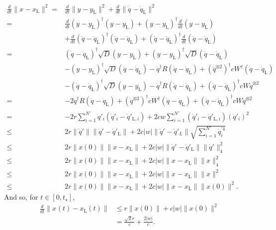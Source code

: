 \documentclass[superscriptaddress,onecolumn,nofootinbib,longbibliography,a4paper,accepted=2026-09-29]{quantumarticle}
\theoremstyle{plain}
\theoremstyle{definition}
\numberwithin{thm}{section}
\numberwithin{assumption}{section}
\numberwithin{lemma}{section}
\numberwithin{prop}{section}
\numberwithin{cor}{section}
\numberwithin{definition}{section}
\numberwithin{rmk}{section}
\numberwithin{equation}{section}
\begin{document}
\begin{align*}
  \frac{d}{dt} \| x_{} - x_{\mathrm{L}} \|^2 =&\frac{d}{dt} \| y_{} - y_{\mathrm{L}} \|^2 + \frac{d}{dt} \| \dot{q}_{} - \dot{q}_{\mathrm{L}} \|^2  \\
     =& \frac{d}{dt}( y_{} - y_{\mathrm{L}})^\dag (y_{} - y_{\mathrm{L}}) +  ( y_{} - y_{\mathrm{L}})^\dag\frac{d}{dt}(y_{} - y_{\mathrm{L}}) \\
   & + \frac{d}{dt}( \dot{q}_{} - \dot{q}_{\mathrm{L}})^\dag (\dot{q}_{} - \dot{q}_{\mathrm{L}}) +  ( \dot{q}_{} - \dot{q}_{\mathrm{L}})^\dag\frac{d}{dt}(\dot{q}_{} - \dot{q}_{\mathrm{L}})
   \\
     =& (\dot{q}_{} - \dot{q}_{\mathrm{L}})^\dag \sqrt{D}(y_{} - y_{\mathrm{L}}) +  ( y_{} - y_{\mathrm{L}})^\dag \sqrt{D}(\dot{q}_{} - \dot{q}_{\mathrm{L}}) \\
   &  - (y_{} - y_{\mathrm{L}})^\dag \sqrt{D} (\dot{q}_{} - \dot{q}_{\mathrm{L}}) -   \dot{q}_{} ^\dag R (\dot{q}_{} - \dot{q}_{\mathrm{L}}) + (\dot{q}^{\otimes 2})^\dag_{} c W^\dag (\dot{q}_{} - \dot{q}_{\mathrm{L}})   \\ &  - (\dot{q}_{} - \dot{q}_{\mathrm{L}})^\dag \sqrt{D} (y_{} - y_{\mathrm{L}})  -   \dot{q}_{}^\dag R (\dot{q}_{} - \dot{q}_{\mathrm{L}}) +  (\dot{q}_{} - \dot{q}_{\mathrm{L}})^\dag c W \dot{q}^{\otimes 2}_{}  \\ 
      =&  -2 \dot{q}^\dag R (\dot{q}_{} - \dot{q}_{\mathrm{L}}) + (\dot{q}^{\otimes 2})^\dag_{} c W^\dag (\dot{q}_{} - \dot{q}_{\mathrm{L}})    +  (\dot{q}_{} - \dot{q}_{\mathrm{L}})^\dag c W \dot{q}^{\otimes 2}_{}  
    \\
     =&  - 2r \sum_{i=1}^{N'} \dot{q}'_{i}( \dot{q}'_{i} - \dot{q}'_{\mathrm{L},i}) + 2c w \sum_{i=1}^{N'} ( \dot{q}'_{i} - \dot{q}'_{\mathrm{L}, i}) (\dot{q}'_{i})^2
     \\
     \leq &   2r \|\dot{q}'\|\| \dot{q}' - \dot{q}'_{\mathrm{L}}\| + 2c |w| \| \dot{q}'_{} - \dot{q}'_{L} \| \sqrt{\sum_{i=1}^{N'} \dot{q}_i^{'4}}
      \\
     \leq &   2r \|x(0)\| \|x - x_{\mathrm{L}}\| + 2c|w| \| \dot{q}'_{} - \dot{q}'_{\mathrm{L}} \| \|\dot{q}'_{}\|_4^2
     \\
       \leq &   2r \|x(0)\| \|x - x_{\mathrm{L}}\| + 2c|w| \| x_{} - x_{\mathrm{L}} \| \|x\|^2_4
        \\
       \leq &   2r \|x(0)\| \|x - x_{\mathrm{L}}\| + 2c|w| \| x_{} - x_{\mathrm{L}} \| \|x\|^2 \\
           \leq &   2r \|x(0)\| \|x - x_{\mathrm{L}}\| + 2c|w| \| x_{} - x_{\mathrm{L}} \| \|x(0)\|^2.
\end{align*}
And so, for $t\in[0,t_\star]$,
\begin{align}
    \frac{d}{dt} \| x_{}(t) - x_{\mathrm{L}}(t) \|   
     &\leq  r \|x(0)\|  + c|w| \|x(0)\|^2 \\
     & = \frac{\sqrt{2}r}{c}  + \frac{2|w|}{c}. 
\end{align}
\end{document}
